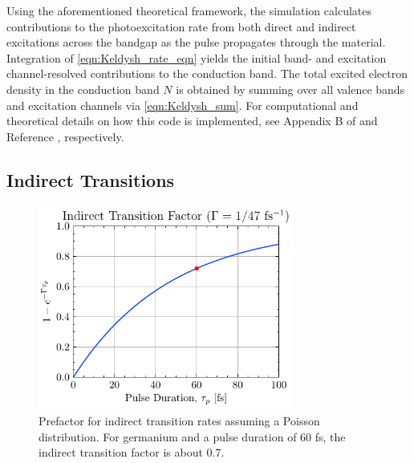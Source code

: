 Using the aforementioned theoretical framework, the simulation calculates contributions to the photoexcitation rate from both direct and indirect excitations across the bandgap as the pulse propagates through the material. Integration of \cref{eqn:Keldysh_rate_eqn} yields the initial band- and excitation channel-resolved contributions to the conduction band. The total excited electron density in the conduction band $N$ is obtained by summing over all valence bands and excitation channels via \cref{eqn:Keldysh_sum}. For computational and theoretical details on how this code is implemented, see Appendix B of \cite{austinSemiconductorSurfaceModification2017} and Reference \cite{sergaevaUltrafastExcitationConductionband2018}, respectively.

\subsection{Indirect Transitions}
\label{sec:indirect_transitions}

\begin{figure}
	\centering
	\includegraphics[width=0.75\textwidth]{figures/chap4/Indirect_transition_factor.pdf}
	\caption{Prefactor for indirect transition rates assuming a Poisson distribution. For germanium and a pulse duration of 60 fs, the indirect transition factor is about 0.7.}
	\label{fig:Indirect_transition_factor}
\end{figure}

